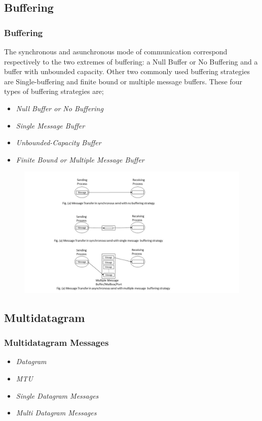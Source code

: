 \documentclass{beamer}
\begin{document}
\subsection{Buffering}
\begin{frame}[allowframebreaks]
	\frametitle{Buffering}
	The synchronous and asunchronous mode of communication correspond respectively to the
	two extremes of buffering: a Null Buffer or No Buffering and a buffer with unbounded
	capacity. Other two commonly used buffering strategies are Single-buffering and finite
	bound or multiple message buffers. These four types of buffering strategies are;
	\begin{itemize}
		\item \textit{Null Buffer or No Buffering}
		\item \textit{Single Message Buffer}
		\item \textit{Unbounded-Capacity Buffer}
		\item \textit{Finite Bound or Multiple Message Buffer}
	\end{itemize}
	\vspace{1.5cm}		
	\framebreak
	\begin{figure}
		\centering
		\includegraphics[width=15cm]{buffering.jpg}
	\end{figure}
	\vspace{1cm}
\end{frame}



\subsection{Multidatagram}
\begin{frame}
	\frametitle{Multidatagram Messages}
	\begin{itemize}
		\item \textit{Datagram}
		\item \textit{MTU}
		\item \textit{Single Datagram Messages}
		\item \textit{Multi Datagram Messages}
	\end{itemize}
	\vspace{4cm}
\end{frame}
\end{document}
